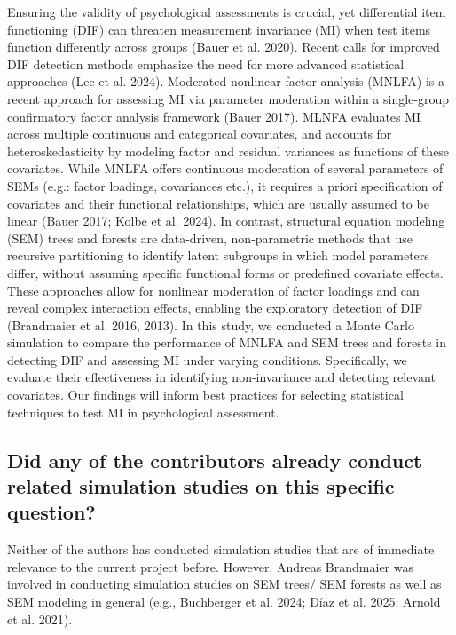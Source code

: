 \documentclass[
  man,
  floatsintext]{apa7}
\begin{document}
Ensuring the validity of psychological assessments is crucial, yet
differential item functioning (DIF) can threaten measurement invariance
(MI) when test items function differently across groups (Bauer et al.
2020). Recent calls for improved DIF detection methods emphasize the
need for more advanced statistical approaches (Lee et al. 2024).
Moderated nonlinear factor analysis (MNLFA) is a recent approach for
assessing MI via parameter moderation within a single-group confirmatory
factor analysis framework (Bauer 2017). MLNFA evaluates MI across
multiple continuous and categorical covariates, and accounts for
heteroskedasticity by modeling factor and residual variances as
functions of these covariates. While MNLFA offers continuous moderation
of several parameters of SEMs (e.g.: factor loadings, covariances etc.),
it requires a priori specification of covariates and their functional
relationships, which are usually assumed to be linear (Bauer 2017; Kolbe
et al. 2024). In contrast, structural equation modeling (SEM) trees and
forests are data-driven, non-parametric methods that use recursive
partitioning to identify latent subgroups in which model parameters
differ, without assuming specific functional forms or predefined
covariate effects. These approaches allow for nonlinear moderation of
factor loadings and can reveal complex interaction effects, enabling the
exploratory detection of DIF (Brandmaier et al. 2016, 2013). In this
study, we conducted a Monte Carlo simulation to compare the performance
of MNLFA and SEM trees and forests in detecting DIF and assessing MI
under varying conditions. Specifically, we evaluate their effectiveness
in identifying non-invariance and detecting relevant covariates. Our
findings will inform best practices for selecting statistical techniques
to test MI in psychological assessment.

\subsection{Did any of the contributors already conduct related
simulation studies on this specific
question?}\label{did-any-of-the-contributors-already-conduct-related-simulation-studies-on-this-specific-question}

Neither of the authors has conducted simulation studies that are of
immediate relevance to the current project before. However, Andreas
Brandmaier was involved in conducting simulation studies on SEM trees/
SEM forests as well as SEM modeling in general (e.g., Buchberger et al.
2024; Díaz et al. 2025; Arnold et al. 2021).
\end{document}
